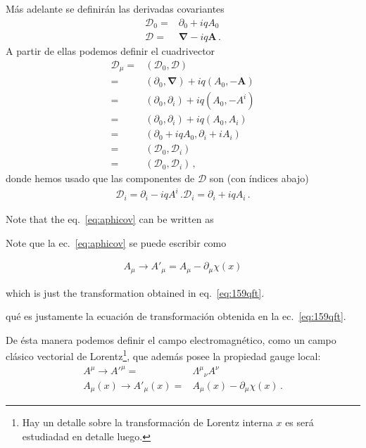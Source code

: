 Más adelante se definirán las derivadas  covariantes
\begin{align}
   \mathcal{D}_0=&\partial_0+i q A_0\nonumber\\
  \boldsymbol{\mathcal{D}}=&\boldsymbol{\nabla}-i q \mathbf{A}\,.
\end{align}
A partir de ellas podemos definir el cuadrivector
\begin{align}
  \mathcal{D}_\mu=&(\mathcal{D}_0,\boldsymbol{\mathcal{D}})\nonumber\\
=&(\partial_0,\boldsymbol{\nabla})+i q(A_0,-\mathbf{A})\nonumber\\
=&(\partial_0,\partial_i)+i q(A_0,-A^i)\nonumber\\
=&(\partial_0,\partial_i)+i q(A_0,A_i)\nonumber\\
=&(\partial_0+i q A_0,\partial_i+i A_i)\nonumber\\
=&(\mathcal{D}_0,\mathcal{D}_i)\nonumber\\
=&(\mathcal{D}_0,\mathcal{D}_i)\,,
\end{align}
donde hemos usado que las componentes de $\mathcal{D}$ son (con índices abajo)
\begin{align}
\mathcal{D}_i=\partial_i-i q A^i\,.
  \mathcal{D}_i=\partial_i+i q A_i\,.
\end{align}

\begin{english}
Note that the eq.~\eqref{eq:aphicov} can be written as  
\end{english}
\begin{spanish}
Note que la ec.~\eqref{eq:aphicov} se puede escribir como
\end{spanish}

\begin{align}
\label{eq:168qft}
  A_\mu\to A'_\mu=A_\mu-\partial_\mu\chi(x)
\end{align}
\begin{english}
which is just the transformation obtained in eq.~\eqref{eq:159qft}.  
\end{english}
\begin{spanish} %
qué es justamente la ecuación de transformación obtenida en la ec.~\eqref{eq:159qft}.  
\end{spanish}


\begin{frame}
De ésta manera podemos definir el campo electromagnético, como un campo clásico vectorial de Lorentz\footnote{Hay un detalle sobre la transformación de Lorentz interna $x$ es será estudiadad en detalle luego.}, que además posee la propiedad gauge local:
\begin{align*}
  A^\mu \to {A'}^\mu =& {\Lambda^\mu}_\nu A^\nu\\
 A_\mu(x)\to A'_\mu(x)=&A_\mu(x)-\partial_\mu\chi(x)\,.
\end{align*}
\end{frame}


